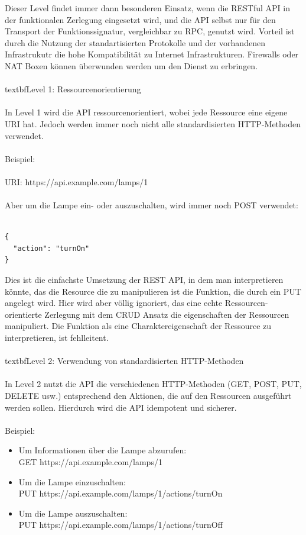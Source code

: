 Dieser Level findet immer dann besonderen Einsatz, wenn die RESTful API in der funktionalen Zerlegung eingesetzt wird, und die API selbst nur für den Transport der Funktionssignatur, vergleichbar zu RPC, genutzt wird. Vorteil ist durch die Nutzung der standartisierten Protokolle und der vorhandenen Infrastrukutr die hohe Kompatibilität zu Internet Infrastrukturen. Firewalls oder NAT Boxen können überwunden werden um den Dienst zu erbringen. 
\\\\
textbf{Level 1}: Ressourcenorientierung
\\\\
In Level 1 wird die API ressourcenorientiert, wobei jede Ressource eine eigene URI hat. Jedoch werden immer noch nicht alle standardisierten HTTP-Methoden verwendet.
\\\\
Beispiel:
\\\\
URI: https://api.example.com/lamps/1
\\\\
Aber um die Lampe ein- oder auszuschalten, wird immer noch POST verwendet:
\\\\
\noindent\begin{minipage}{\textwidth}
\begin{lstlisting}[caption={Level 1},captionpos=b,label={lst:level_1}]
{
  "action": "turnOn"
}
\end{lstlisting}
\end{minipage}
Dies ist die einfachste Umsetzung der REST API, in dem man interpretieren könnte, das die Resource die zu manipulieren ist die Funktion, die durch ein PUT angelegt wird. Hier wird aber völlig ignoriert, das eine echte Ressourcen-orientierte Zerlegung mit dem CRUD Ansatz die eigenschaften der Ressourcen manipuliert. Die Funktion als eine Charaktereigenschaft der Ressource zu interpretieren, ist fehlleitent. 
\\\\
textbf{Level 2}: Verwendung von standardisierten HTTP-Methoden
\\\\
In Level 2 nutzt die API die verschiedenen HTTP-Methoden (GET, POST, PUT, DELETE usw.) entsprechend den Aktionen, die auf den Ressourcen ausgeführt werden sollen. Hierdurch wird die API idempotent und sicherer.
\\\\
Beispiel:
\begin{itemize}
\item Um Informationen über die Lampe abzurufen:\\ 
GET https://api.example.com/lamps/1
\item  Um die Lampe einzuschalten:\\ PUT https://api.example.com/lamps/1/actions/turnOn
\item Um die Lampe auszuschalten:\\ PUT https://api.example.com/lamps/1/actions/turnOff
\end{itemize}
